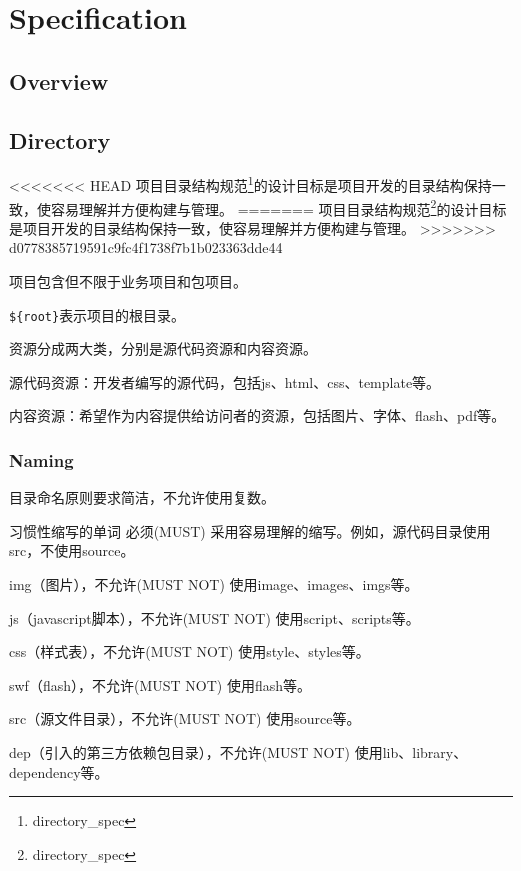 \part{Specification}



\chapter{Overview}




\chapter{Directory}


<<<<<<< HEAD
项目目录结构规范\footnote{directory_spec}的设计目标是项目开发的目录结构保持一致，使容易理解并方便构建与管理。
=======
项目目录结构规范\footnote{directory\_spec}的设计目标是项目开发的目录结构保持一致，使容易理解并方便构建与管理。
>>>>>>> d0778385719591c9fc4f1738f7b1b023363dde44


\begin{compactitem}
\item 项目包含但不限于业务项目和包项目。
\item \texttt{\$\{root\}}表示项目的根目录。
\end{compactitem}


资源分成两大类，分别是源代码资源和内容资源。

\begin{compactenum}
\item 源代码资源：开发者编写的源代码，包括js、html、css、template等。
\item 内容资源：希望作为内容提供给访问者的资源，包括图片、字体、flash、pdf等。
\end{compactenum}

\section{Naming}


目录命名原则要求简洁，不允许使用复数。

习惯性缩写的单词 必须(MUST) 采用容易理解的缩写。例如，源代码目录使用src，不使用source。

\begin{compactitem}
\item img（图片），不允许(MUST NOT) 使用image、images、imgs等。
\item js（javascript脚本），不允许(MUST NOT) 使用script、scripts等。
\item css（样式表），不允许(MUST NOT) 使用style、styles等。
\item swf（flash），不允许(MUST NOT) 使用flash等。
\item src（源文件目录），不允许(MUST NOT) 使用source等。
\item dep（引入的第三方依赖包目录），不允许(MUST NOT) 使用lib、library、dependency等。
\end{compactitem}

